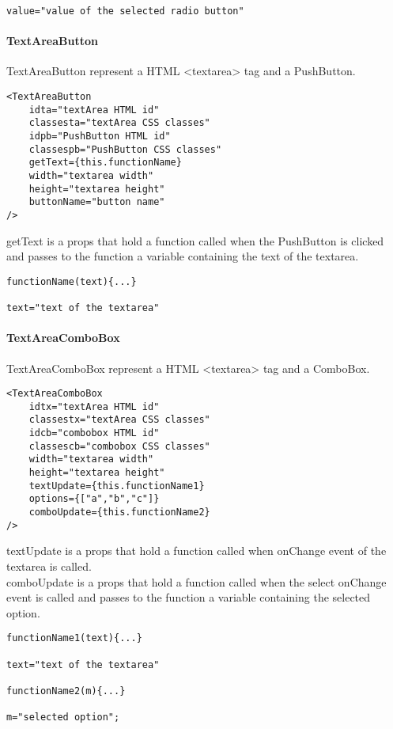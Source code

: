 \begin{flushleft}
\begin{verbatim}
value="value of the selected radio button"
\end{verbatim}

    \paragraph{TextAreaButton}
TextAreaButton represent a HTML <textarea> tag and a PushButton.
\begin{verbatim}
<TextAreaButton
    idta="textArea HTML id"
    classesta="textArea CSS classes"
    idpb="PushButton HTML id"
    classespb="PushButton CSS classes"
    getText={this.functionName}
    width="textarea width"
    height="textarea height"
    buttonName="button name"
/>
\end{verbatim}
getText is a props that hold a function called when the PushButton is clicked and passes to the function a variable containing the text of the textarea.
\begin{verbatim}
functionName(text){...}

text="text of the textarea"
\end{verbatim}

    \paragraph{TextAreaComboBox}
TextAreaComboBox represent a HTML <textarea> tag and a ComboBox.
\begin{verbatim}
<TextAreaComboBox
    idtx="textArea HTML id"
    classestx="textArea CSS classes"
    idcb="combobox HTML id"
    classescb="combobox CSS classes"
    width="textarea width"
    height="textarea height"
    textUpdate={this.functionName1}
    options={["a","b","c"]}
    comboUpdate={this.functionName2}
/>
\end{verbatim}
textUpdate is a props that hold a function called when onChange event of the textarea is called.\\
comboUpdate is a props that hold a function called when the select onChange event is called and passes to the function a variable containing the selected option.
\begin{verbatim}
functionName1(text){...}

text="text of the textarea"

functionName2(m){...}

m="selected option";
\end{verbatim}
\end{flushleft}

